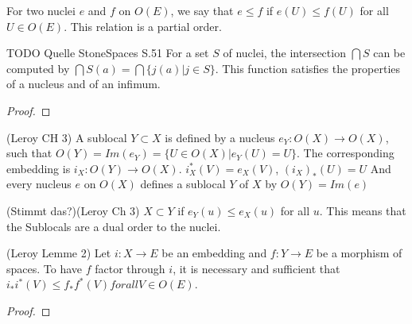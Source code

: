 \begin{definition}
    \label{def:nucleus_partial_order}
    \leanok
    For two nuclei $e$ and $f$ on $O(E)$, we say that $e \le f$ if $e(U) \le f(U)$ for all $U \in O(E)$.
    This relation is a partial order.
\end{definition}

\begin{lemma} 
    \label{lem:nucleus_intersection}
    \leanok
    TODO Quelle StoneSpaces S.51
    For a set $S$ of nuclei, the intersection $\bigcap S$ can be computed by $\bigcap S(a) = \bigcap \{j(a) | j \in S \}$.
    This function satisfies the properties of a nucleus and of an infimum.
\end{lemma}
\begin{proof}
    \leanok
\end{proof}


\begin{definition}[Sublocal]
(Leroy CH 3)
    \label{def:sublocal}
    \leanok
    A sublocal $Y \subset X$ is defined by a nucleus $e_Y: O(X) \rightarrow O(X)$, such that $O(Y) = Im(e_Y) = \{U \in O(X) | e_Y(U) = U\}$.
    The corresponding embedding is $i_X : O(Y) \rightarrow O(X)$. $i^*_X(V) = e_X(V)$, $(i_X)_*(U) = U$
    And every nucleus $e$ on $O(X)$ defines a sublocal $Y$ of $X$ by $O(Y) = Im(e)$
\end{definition}

\begin{definition}
(Stimmt das?)(Leroy Ch 3)
    \label{def:sublocal_inclusion}
    \leanok
    $X \subset Y$ if $e_Y(u) \le e_X(u)$ for all $u$. This means that the Sublocals are a dual order to the nuclei.
\end{definition}


\begin{lemma}[factorisation]
(Leroy Lemme 2)
    \label{lem:factorisation}
    \leanok
    Let $i : X \rightarrow E$ be an embedding and $f: Y \rightarrow E$ be a morphism of spaces. To have $f$ factor through $i$, it is necessary and sufficient that $i_*i^*(V) \le f_*f^*(V) for all V \in O(E)$.
\end{lemma}
\begin{proof}
    \leanok
\end{proof}

